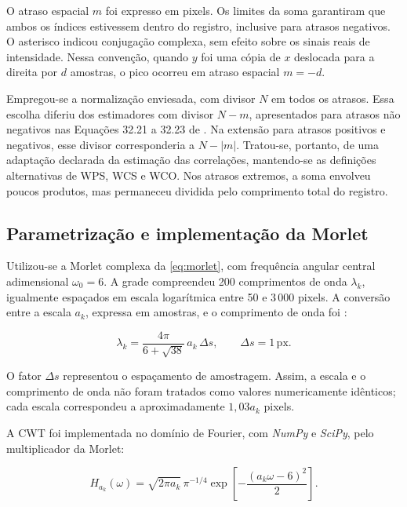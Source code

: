 \noindent
O atraso espacial $m$ foi expresso em pixels. Os limites da soma garantiram que
ambos os índices estivessem dentro do registro, inclusive para atrasos negativos.
O asterisco indicou conjugação complexa, sem efeito sobre os sinais reais de
intensidade. Nessa convenção, quando $y$ foi uma cópia de $x$ deslocada para a
direita por $d$ amostras, o pico ocorreu em atraso espacial $m=-d$.

Empregou-se a normalização enviesada, com divisor $N$ em todos os atrasos. Essa
escolha diferiu dos estimadores com divisor $N-m$, apresentados para atrasos
não negativos nas Equações 32.21 a 32.23 de .
Na extensão para atrasos positivos e negativos, esse divisor corresponderia a
$N-|m|$. Tratou-se, portanto, de uma adaptação declarada da
estimação das correlações, mantendo-se as definições alternativas de WPS, WCS e WCO.
Nos atrasos extremos, a soma envolveu poucos produtos, mas permaneceu dividida pelo
comprimento total do registro.

\subsection{Parametrização e implementação da Morlet}\label{sec:met-wco-morlet}

Utilizou-se a Morlet complexa da \autoref{eq:morlet}, com frequência angular central
adimensional $\omega_0=6$. A grade compreendeu 200 comprimentos de onda
$\lambda_k$, igualmente espaçados em escala logarítmica entre 50 e 3\,000 pixels.
A conversão entre a escala $a_k$, expressa em amostras, e o comprimento de onda foi
\cite{torrence1998,schuck2019}:

\begin{equation}\label{eq:met-escala}
  \lambda_k=\frac{4\pi}{6+\sqrt{38}}\,a_k\,\Delta s,
  \qquad \Delta s=1\,\mathrm{px}.
\end{equation}

\noindent
O fator $\Delta s$ representou o espaçamento de amostragem. Assim, a escala e o
comprimento de onda não foram tratados como valores numericamente idênticos; cada
escala correspondeu a aproximadamente $1{,}03a_k$ pixels.

A CWT foi implementada no domínio de Fourier, com \textit{NumPy} e
\textit{SciPy}, pelo multiplicador da Morlet:

\begin{equation}\label{eq:met-morlet-fourier}
  H_{a_k}(\omega)=\sqrt{2\pi a_k}\,\pi^{-1/4}
       \exp\!\left[-\frac{(a_k\omega-6)^2}{2}\right].
\end{equation}


